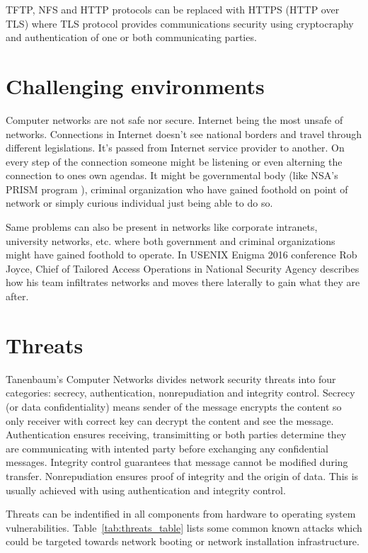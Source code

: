 TFTP, NFS and HTTP protocols can be replaced with HTTPS (HTTP over
TLS) where TLS protocol provides communications security using
cryptocraphy and authentication of one or both communicating parties.


\section{Challenging environments}

Computer networks are not safe nor secure. Internet being the most
unsafe of networks. Connections in Internet doesn't see national
borders and travel through different legislations. It's passed from
Internet service provider to another. On every step of the connection
someone might be listening or even alterning the connection to ones
own agendas. It might be governmental body (like NSA's PRISM
program \cite{nsa-prism}), criminal organization who have gained
foothold on point of network or simply curious individual just being
able to do so.

Same problems can also be present in networks like corporate
intranets, university networks, etc. where both government and
criminal organizations might have gained foothold to operate. In
USENIX Enigma 2016 conference Rob Joyce, Chief of Tailored Access
Operations in National Security Agency \cite{nsa-tao} describes how
his team infiltrates networks and moves there laterally to gain what
they are after.



\section{Threats}

Tanenbaum's Computer Networks\cite{Tanenbaum} divides network security
threats into four categories: secrecy, authentication, nonrepudiation
and integrity control. Secrecy (or data confidentiality) means sender
of the message encrypts the content so only receiver with correct key
can decrypt the content and see the message. Authentication ensures
receiving, transimitting or both parties determine they are
communicating with intented party before exchanging any confidential
messages. Integrity control guarantees that message cannot be modified
during transfer. Nonrepudiation ensures proof of integrity and the
origin of data. This is usually achieved with using authentication and
integrity control.

Threats can be indentified in all components from hardware to
operating system vulnerabilities. Table~\ref{tab:threats_table} lists
some common known attacks which could be targeted towards network
booting or network installation infrastructure.

